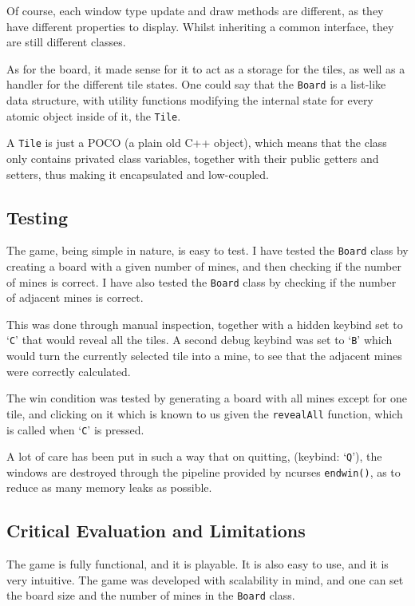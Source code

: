 \documentclass{article}
\newcommand{\code}[1]{\texttt{#1}}
\begin{document}
Of course, each window type update and draw methods are different, as they have different
properties to display. Whilst inheriting a common interface, they are still
different classes.

As for the board, it made sense for it to act as a storage for the tiles, as well as a 
handler for the different tile states. One could say that the \code{Board} is a list-like data structure, 
with utility functions modifying the internal state for every atomic object inside of it, the \code{Tile}.

A \code{Tile} is just a POCO (a plain old C++ object), which means that the class only contains privated class variables, together with their public 
getters and setters, thus making it encapsulated and low-coupled.


\subsection{Testing}

The game, being simple in nature, is easy to test. I have tested
the \code{Board} class by creating a board with a given number of mines, and
then checking if the number of mines is correct. I have also tested the
\code{Board} class by checking if the number of adjacent mines is correct.

This was done through manual inspection, together with a hidden keybind set to `\code{C}' that would reveal all the tiles.
A second debug keybind was set to `\code{B}' which would turn the currently selected tile into a mine, 
to see that the adjacent mines were correctly calculated.

The win condition was tested by generating a board with all mines except for one tile, and clicking on it
 which is known to us given the \code{revealAll} function, which is called when `\code{C}' is pressed.

 A lot of care has been put in such a way that on quitting, (keybind: `\code{Q}'), the windows are destroyed 
 through the pipeline provided by ncurses \code{endwin()}, as to reduce as many memory leaks as possible.

\subsection{Critical Evaluation and Limitations}

The game is fully functional, and it is playable. It is also easy to use, and
it is very intuitive. The game was developed with scalability in mind, and one can set 
the board size and the number of mines in the \code{Board} class.
\end{document}
